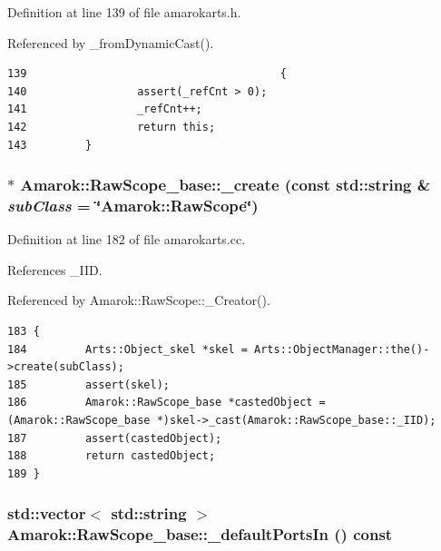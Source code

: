 Definition at line 139 of file amarokarts.h.

Referenced by \_\-from\-Dynamic\-Cast().



\footnotesize\begin{verbatim}139                                       {
140                 assert(_refCnt > 0);
141                 _refCnt++;
142                 return this;
143         }
\end{verbatim}\normalsize 
{}
\subsubsection{ $\ast$ Amarok::Raw\-Scope\_\-base::\_\-create (const std::string \& {\em sub\-Class} = \char`\"{}Amarok::Raw\-Scope\char`\"{})\hspace{0.3cm}{\tt  [static]}}\label{classAmarok_1_1RawScope__base_Amarok_1_1RawScope__stube0}




Definition at line 182 of file amarokarts.cc.

References \_\-IID.

Referenced by Amarok::Raw\-Scope::\_\-Creator().



\footnotesize\begin{verbatim}183 {
184         Arts::Object_skel *skel = Arts::ObjectManager::the()->create(subClass);
185         assert(skel);
186         Amarok::RawScope_base *castedObject = (Amarok::RawScope_base *)skel->_cast(Amarok::RawScope_base::_IID);
187         assert(castedObject);
188         return castedObject;
189 }
\end{verbatim}\normalsize 
{}
\subsubsection{\setlength{\rightskip}{0pt plus 5cm}std::vector$<$ std::string $>$ Amarok::Raw\-Scope\_\-base::\_\-default\-Ports\-In () const\hspace{0.3cm}{\tt  [virtual]}}\label{classAmarok_1_1RawScope__base_Amarok_1_1RawScope__stuba5}




